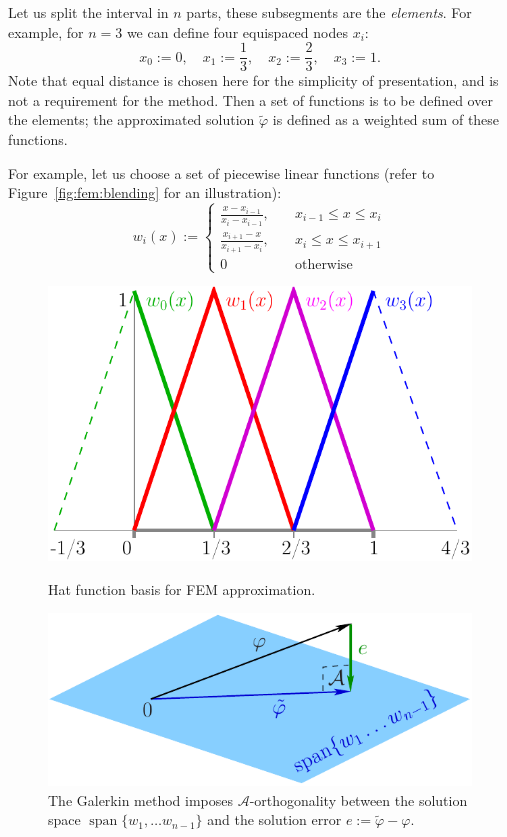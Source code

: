 \documentclass[notitlepage,oneside]{book}
\DeclareMathOperator{\Span}{span}
\begin{document}
Let us split the interval in $n$ parts, these subsegments are the \textit{elements}.
For example, for $n=3$ we can define four equispaced nodes $x_i$:
$$
x_0 := 0, \quad x_1 := \frac{1}{3}, \quad x_2 := \frac{2}{3}, \quad x_3 := 1.
$$
Note that equal distance is chosen here for the simplicity of presentation, and is not a requirement for the method.
Then a set of functions is to be defined over the elements; the approximated solution $\tilde{\varphi}$ is defined as a weighted sum of these functions.

For example, let us choose a set of piecewise linear functions (refer to Figure~\ref{fig:fem:blending} for an illustration):
$$
w_i(x) := \left\{
\begin{split}
\frac{x-x_{i-1}}{x_i-x_{i-1}}, & \quad x_{i-1}\leq x \leq x_i \\
\frac{x_{i+1}-x}{x_{i+1}-x_i}, & \quad x_i\leq x \leq x_{i+1}\\
0 & \quad \text{otherwise}
\end{split}
\right.
$$

\begin{figure}[ht]
\begin{minipage}{.45\linewidth}
	\centering
	\includegraphics[width=\linewidth]{img/blending_functions.pdf}
	\caption{Hat function basis for FEM approximation.}
	\label{fig:fem:blending}
\end{minipage}
\hspace{.05\linewidth}
\begin{minipage}{.5\linewidth}
	\centering
	\includegraphics[width=\linewidth]{img/galerkin.pdf}
	\caption{The Galerkin method imposes $\mathcal A$-orthogonality between the solution space $\Span\{w_1,\dots w_{n-1}\}$ and the solution error  $e := \tilde{\varphi} - \varphi$.}
	\label{fig:galerkin}
\end{minipage}
\end{figure}
\end{document}
